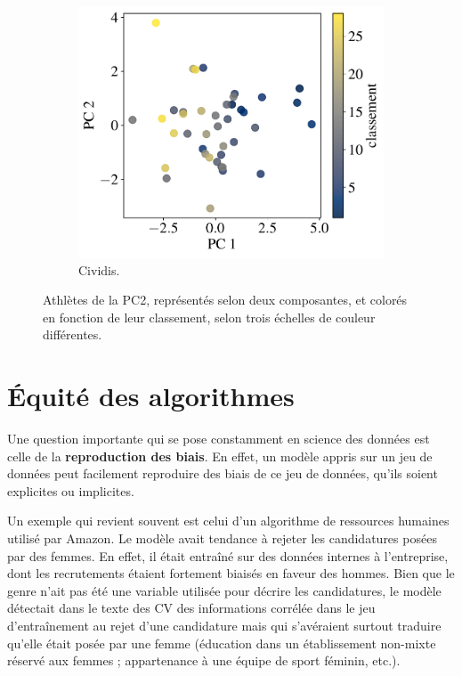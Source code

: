 \begin{figure}[h]
  \begin{subfigure}[t]{0.30\textwidth}
    \centering
    \includegraphics[width=\textwidth]{figures/pratiques/pca_plot_cividis}
    \caption{Cividis.}
    \label{fig:pca_plot_cividis}
  \end{subfigure} 
  \caption{Athlètes de la PC2, représentés selon deux composantes, et colorés
    en fonction de leur classement, selon trois échelles de couleur
    différentes.}
  \label{fig:pca_plot}
\end{figure}

\section{Équité des algorithmes}
Une question importante qui se pose constamment en science des données est
celle de la \textbf{reproduction des biais}. En effet, un modèle appris sur un
jeu de données peut facilement reproduire des biais de ce jeu de données,
qu'ils soient explicites ou implicites.

Un exemple qui revient souvent est celui d'un algorithme de ressources humaines
utilisé par Amazon. Le modèle avait tendance à rejeter les candidatures posées
par des femmes. En effet, il était entraîné sur des données internes à
l'entreprise, dont les recrutements étaient fortement biaisés en faveur des
hommes. Bien que le genre n'ait pas été une variable utilisée pour décrire les
candidatures, le modèle détectait dans le texte des CV des informations
corrélée dans le jeu d'entraînement au rejet d'une candidature mais qui
s'avéraient surtout traduire qu'elle était posée par une femme (éducation dans
un établissement non-mixte réservé aux femmes ; appartenance à une équipe de
sport féminin, etc.).

